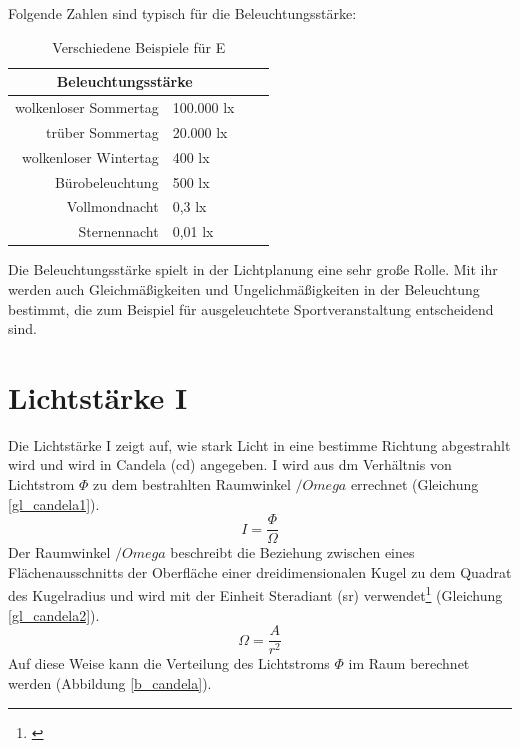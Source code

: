 
Folgende Zahlen sind typisch für die Beleuchtungsstärke:

\begin{table}[htp] 
		\centering
		\begin{tabular}{rlcc}  %
		\toprule
		\multicolumn{2}{c}{\large\sffamily Beleuchtungsstärke}\\ 							
		\midrule
		wolkenloser Sommertag & 100.000 lx\\
		trüber Sommertag & 20.000 lx\\
		wolkenloser Wintertag & 400 lx\\
		Bürobeleuchtung & 500 lx\\
		Vollmondnacht & 0,3 lx\\
		Sternennacht & 0,01 lx\\
		\bottomrule
		\end{tabular}
		\caption{Verschiedene Beispiele für E\protect\footnotemark}	
		\label{t_lux}
	\end{table}
Die Beleuchtungsstärke spielt in der Lichtplanung eine sehr große Rolle. Mit ihr werden auch Gleichmäßigkeiten und Ungelichmäßigkeiten in der Beleuchtung bestimmt, die zum Beispiel für ausgeleuchtete Sportveranstaltung entscheidend sind.

\section{Lichtstärke I}\label{sec_candela}
Die Lichtstärke I zeigt auf, wie stark Licht in eine bestimme Richtung abgestrahlt wird und wird in Candela (cd) angegeben. I wird aus dm Verhältnis von Lichtstrom $\Phi$ zu dem bestrahlten Raumwinkel $/Omega$ errechnet (Gleichung \ref{gl_candela1}).
 \begin{equation}\label{gl_candela1}
	I=\frac{\Phi}{\Omega}	
\end{equation}
Der Raumwinkel $/Omega$ beschreibt die Beziehung zwischen eines Flächenausschnitts der Oberfläche einer dreidimensionalen Kugel zu dem Quadrat des Kugelradius und wird mit der Einheit Steradiant (sr) verwendet\footnote{\cite[26]{ris}}  (Gleichung \ref{gl_candela2}).
 \begin{equation}\label{gl_candela2}
	\Omega=\frac{A}{r^{2}}	
\end{equation}
Auf diese Weise kann die Verteilung des Lichtstroms $\Phi$ im Raum berechnet werden (Abbildung \ref{b_candela}).

